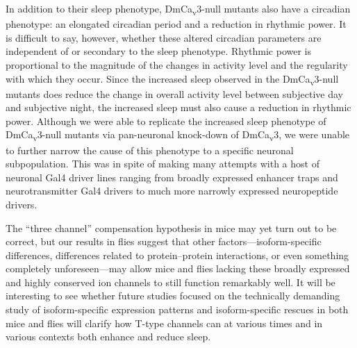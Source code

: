In addition to their sleep phenotype, DmCa\textsubscript{v}3-null mutants also have a circadian phenotype: an elongated circadian period and a reduction in rhythmic power.
It is difficult to say, however, whether these altered circadian parameters are independent of or secondary to the sleep phenotype.
Rhythmic power is proportional to the magnitude of the changes in activity level and the regularity with which they occur.
Since the increased sleep observed in the DmCa\textsubscript{v}3-null mutants does reduce the change in overall activity level between subjective day and subjective night, the increased sleep must also cause a reduction in rhythmic power.
Although we were able to replicate the increased sleep phenotype of DmCa\textsubscript{v}3-null mutants via pan-neuronal knock-down of DmCa\textsubscript{v}3, we were unable to further narrow the cause of this phenotype to a specific neuronal subpopulation.
This was in spite of making many attempts with a host of neuronal Gal4 driver lines ranging from broadly expressed enhancer traps and neurotransmitter Gal4 drivers to much more narrowly expressed neuropeptide drivers.

The ``three channel'' compensation hypothesis in mice may yet turn out to be correct, but our results in flies suggest that other factors---isoform-specific differences, differences related to protein--protein interactions, or even something completely unforeseen---may allow mice and flies lacking these broadly expressed and highly conserved ion channels to still function remarkably well.
It will be interesting to see whether future studies focused on the technically demanding study of isoform-specific expression patterns and isoform-specific rescues in both mice and flies will clarify how T-type channels can at various times and in various contexts both enhance and reduce sleep.
